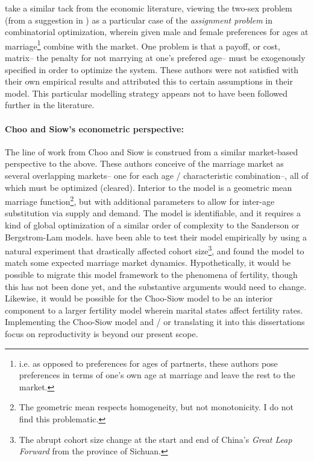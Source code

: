 \citet{bergstrom1994sweden} take a similar tack from the economic literature,
viewing the two-sex problem (from a suggestion in \citet{becker1973theory}) as a
particular case of the \textit{assignment problem} in combinatorial optimization, wherein given male
and female preferences for ages at marriage\footnote{i.e. as opposed to
preferences for ages of partnerts, these authors pose preferences in terms of
one's own age at marriage and leave the rest to the market.} combine with the
market. One problem is that a payoff, or cost, matrix-- the penalty for not
marrying at one's prefered age-- must be exogenously specified in order to
optimize the system. These authors were not satisfied with their own
empirical results and attributed this to certain assumptions in their model.
This particular modelling strategy appears not to have been followed further in
the literature.

\paragraph{Choo and Siow's econometric perspective: } The line of work from Choo
and Siow \citet{choo2006estimating, siow2008does, seitz2010collective} is construed 
from a similar market-based perspective to the above. These
authors conceive of the marriage market as several overlapping markets-- one
for each age / characteristic combination--, all of which must be optimized
(cleared). Interior to the model is a geometric mean marriage
function\footnote{The geometric mean respects homogeneity, but not
monotonicity. I do not find this problematic.}, but with additional
parameters to allow for inter-age substitution via supply and demand. The model
is identifiable, and it requires a kind of global optimization of a similar
order of complexity to the Sanderson or Bergstrom-Lam models. \citet{siow2008does} have
been able to test their model empirically by using a natural experiment that
drastically affected cohort size\footnote{The abrupt cohort size change at the
start and end of China's \textit{Great Leap Forward} from the province of
Sichuan.}, and found the model to match some expected marriage market
dynamics. Hypothetically, it would be possible to migrate this model framework
to the phenomena of fertility, though this has not been done yet, and the
substantive arguments would need to change. Likewise, it would be possible for
the Choo-Siow model to be an interior component to a larger fertility model
wherein marital states affect fertility rates. Implementing the Choo-Siow model
and / or translating it into this dissertations focus on reproductivity is
beyond our present scope. 

